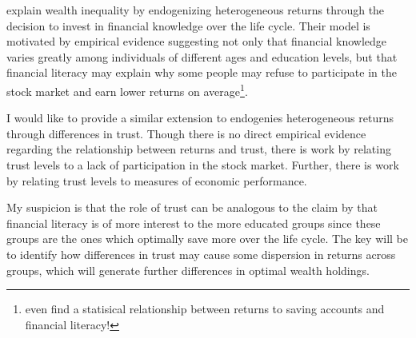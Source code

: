 \documentclass[\econtexRoot/Chp1proposal]{subfiles}
\begin{document}
\par \cite{Lusardi2014} explain wealth inequality by endogenizing heterogeneous returns through the decision to invest in financial knowledge over the life cycle. Their model is motivated by empirical evidence suggesting not only that financial knowledge varies greatly among individuals of different ages and education levels, but that financial literacy may explain why some people may refuse to participate in the stock market and earn lower returns on average\footnote{\cite{Deuflhard2018} even find a statisical relationship between returns to saving accounts and financial literacy!}.

\par I would like to provide a similar extension to endogenies heterogeneous returns through differences in trust. Though there is no direct empirical evidence regarding the relationship between returns and trust, there is work by \cite{lgpslz2008} relating trust levels to a lack of participation in the stock market. Further, there is work by \cite{jbpglg2016} relating trust levels to measures of economic performance.

My suspicion is that the role of trust can be analogous to the claim by \cite{Lusardi2014} that financial literacy is of more interest to the more educated groups since these groups are the ones which optimally save more over the life cycle. The key will be to identify how differences in trust may cause some dispersion in returns across groups, which will generate further differences in optimal wealth holdings. 

\onlyinsubfile{}

\end{document}
